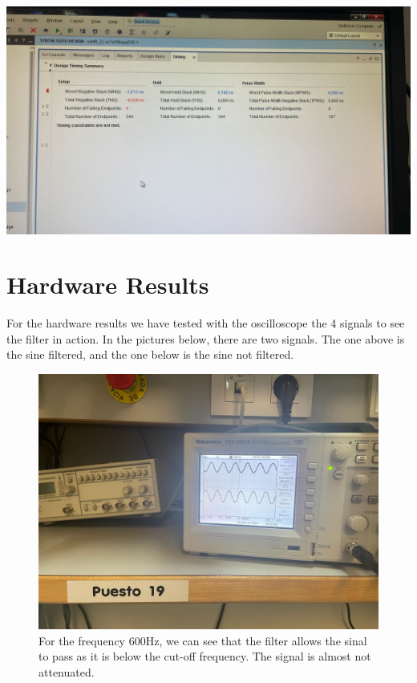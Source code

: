 \documentclass[a4paper, 12pt]{article}
\begin{document}
\begin{center}
\includegraphics[width=.9\linewidth]{./img/time_report_pipeline.jpg}
\end{center}
\section{Hardware Results}
\label{sec:orgf28b31f}
For the hardware results we have tested with the oscilloscope the 4 signals to see the filter in action. In the pictures below, there are two signals. The one above is the sine filtered, and the one below is the sine not filtered.

\begin{figure}[htbp]
\centering
\includegraphics[width=.9\linewidth]{./img/oscilloscope_f_600.jpg}
\caption{For the frequency 600Hz, we can see that the filter allows the sinal to pass as it is below the cut-off frequency. The signal is almost not attenuated.}
\end{figure}
\end{document}

